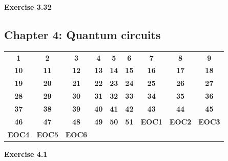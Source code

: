 \documentclass{article}
\newcommand{\notStarted}[1]{\colorbox{red!30}{\textbf{#1}}}
\begin{document}
\bigskip

\begin{framed}
    \noindent \textbf{Exercise 3.32}
    
    \medskip
    
    
\end{framed}

\subsection*{Chapter 4: Quantum circuits}

\begin{center}
\begin{tabular}{*{9}{c}}
\toprule
\notStarted{1} & \notStarted{2} & \notStarted{3} & \notStarted{4} & \notStarted{5} & \notStarted{6} & \notStarted{7} & \notStarted{8} & \notStarted{9} \\
\notStarted{10} & \notStarted{11} & \notStarted{12} & \notStarted{13} & \notStarted{14} & \notStarted{15} & \notStarted{16} & \notStarted{17} & \notStarted{18} \\
\notStarted{19} & \notStarted{20} & \notStarted{21} & \notStarted{22} & \notStarted{23} & \notStarted{24} & \notStarted{25} & \notStarted{26} & \notStarted{27} \\
\notStarted{28} & \notStarted{29} & \notStarted{30} & \notStarted{31} & \notStarted{32} & \notStarted{33} & \notStarted{34} & \notStarted{35} & \notStarted{36} \\
\notStarted{37} & \notStarted{38} & \notStarted{39} & \notStarted{40} & \notStarted{41} & \notStarted{42} & \notStarted{43} & \notStarted{44} & \notStarted{45} \\
\notStarted{46} & \notStarted{47} & \notStarted{48} & \notStarted{49} & \notStarted{50} & \notStarted{51} & \notStarted{EOC1} & \notStarted{EOC2} & \notStarted{EOC3} \\
\notStarted{EOC4} & \notStarted{EOC5} & \notStarted{EOC6} &  &  &  &  &  &  \\
\bottomrule
\end{tabular}
\end{center}


\bigskip

\begin{framed}
    \noindent \textbf{Exercise 4.1}
    
    \medskip
    
    
\end{framed}


\bigskip
\end{document}
